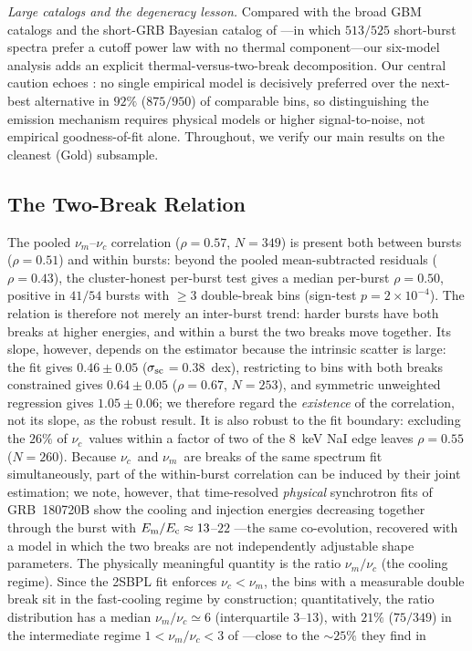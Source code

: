 \documentclass[twocolumn]{aastex631}
\newcommand{\nuc}{\ensuremath{\nu_c}}
\newcommand{\num}{\ensuremath{\nu_m}}
\newcommand{\ssc}{\ensuremath{\sigma_{\rm sc}}}
\begin{document}
\emph{Large catalogs and the degeneracy lesson.}
Compared with the broad GBM catalogs \citep{Kaneko2006,Gruber2014,Yu2016} and the
short-GRB Bayesian catalog of \citet{Burgess2019}---in which $513/525$ short-burst
spectra prefer a cutoff power law with no thermal component---our six-model
analysis adds an explicit thermal-versus-two-break decomposition. Our central
caution echoes \citet{Basak2014}: no single empirical model is decisively
preferred over the next-best alternative in $92\%$ ($875/950$) of comparable
bins, so distinguishing the emission mechanism requires physical models
\citep{Burgess2014b} or higher signal-to-noise, not empirical goodness-of-fit
alone. Throughout, we verify our main results on the cleanest (Gold) subsample.

\subsection{The Two-Break Relation} \label{sec:disc-breaks}
The pooled $\num$--$\nuc$ correlation ($\rho=0.57$, $N=349$) is present both
between bursts ($\rho=0.51$) and within bursts: beyond the pooled
mean-subtracted residuals ($\rho=0.43$), the cluster-honest per-burst test
gives a median per-burst $\rho=0.50$, positive in $41/54$ bursts with
$\ge$$3$ double-break bins (sign-test $p=2\times10^{-4}$). The relation is
therefore not merely an inter-burst trend: harder bursts have both breaks at
higher energies, and within a burst the two breaks move together. Its slope,
however, depends on the estimator because the intrinsic scatter is large: the
\citet{DAgostini2005} fit gives $0.46\pm0.05$ (\ssc$=0.38$~dex), restricting to
bins with both breaks constrained gives $0.64\pm0.05$ ($\rho=0.67$, $N=253$),
and symmetric unweighted regression gives $1.05\pm0.06$; we therefore regard
the \emph{existence} of the correlation, not its slope, as the robust result.
It is also robust to the fit boundary: excluding the $26\%$ of \nuc\ values
within a factor of two of the 8~keV NaI edge leaves $\rho=0.55$ ($N=260$).
Because \nuc\ and \num\ are breaks of the same spectrum fit simultaneously,
part of the within-burst correlation can be induced by their joint estimation;
we note, however, that time-resolved \emph{physical} synchrotron fits of
GRB~180720B show the cooling and injection energies decreasing together
through the burst with $E_{\rm m}/E_{\rm c}\approx13$--$22$
\citep{Ronchi2020}---the same co-evolution, recovered with a model in which
the two breaks are not independently adjustable shape parameters. The
physically meaningful quantity is the ratio $\num/\nuc$ (the cooling
regime). Since the 2SBPL fit enforces $\nuc<\num$, the bins with a measurable
double break sit in the fast-cooling regime by construction; quantitatively,
the ratio distribution has a median $\num/\nuc\simeq6$ (interquartile
$3$--$13$), with $21\%$ ($75/349$) in the intermediate regime
$1<\num/\nuc<3$ of \citet{Mei2025}---close to the $\sim$$25\%$ they find in
\end{document}
